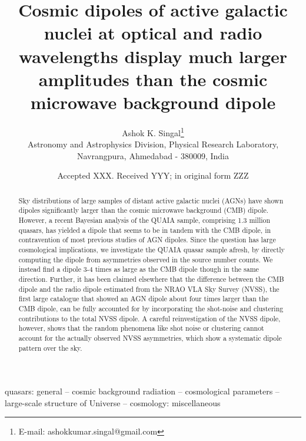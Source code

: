 \documentclass[fleqn,usenatbib]{mnras}
\title[Cosmic AGN dipoles are much larger than CMB dipole]
{Cosmic dipoles of active galactic nuclei at optical and radio wavelengths display much larger amplitudes than the cosmic microwave background dipole}
\author[A. K. Singal]{Ashok K. Singal\thanks{E-mail: ashokkumar.singal@gmail.com}\\
{Astronomy and Astrophysics Division, Physical Research Laboratory, 
Navrangpura, Ahmedabad - 380009, India}}
\date{Accepted XXX. Received YYY; in original form ZZZ}
\begin{document}
\label{firstpage}
\pagerange{\pageref{firstpage}--\pageref{lastpage}}
\maketitle

\begin{abstract}
Sky distributions of large samples of distant active galactic nuclei (AGNs) have shown dipoles significantly larger than the cosmic microwave background (CMB) dipole.
However, a recent Bayesian analysis of the QUAIA sample, comprising 1.3 million quasars, has yielded a dipole that seems to be in tandem with the CMB dipole, in contravention of most previous studies of AGN dipoles. Since the question has large cosmological implications, we investigate the QUAIA quasar sample afresh, by directly computing the dipole from asymmetries observed in the source number counts. We instead find a dipole 3-4 times as large as the CMB dipole though in the same direction. Further, it has been claimed elsewhere that the difference between the CMB dipole and the radio dipole estimated from the NRAO VLA Sky Survey (NVSS), the first large catalogue that showed an AGN dipole about four times larger than the CMB dipole, can be fully accounted for by incorporating the shot-noise and clustering contributions to the total NVSS dipole. A careful reinvestigation of the NVSS dipole, however, shows that the random phenomena like shot noise or clustering cannot account for the actually observed NVSS asymmetries, which show a systematic dipole   pattern over the sky.
\end{abstract}
\begin{keywords}
quasars: general -- cosmic background radiation -- cosmological parameters -- large-scale structure of Universe -- cosmology: miscellaneous
\end{keywords}
\end{document}
